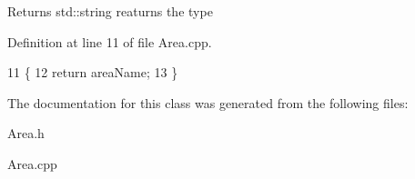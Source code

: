 \begin{DoxyReturn}{Returns}
std\+::string reaturns the type 
\end{DoxyReturn}


Definition at line 11 of file Area.\+cpp.


\begin{DoxyCode}
11                                   \{
12     \textcolor{keywordflow}{return} areaName;
13 \}
\end{DoxyCode}


The documentation for this class was generated from the following files\+:\begin{DoxyCompactItemize}
\item 
Area.\+h\item 
Area.\+cpp\end{DoxyCompactItemize}
